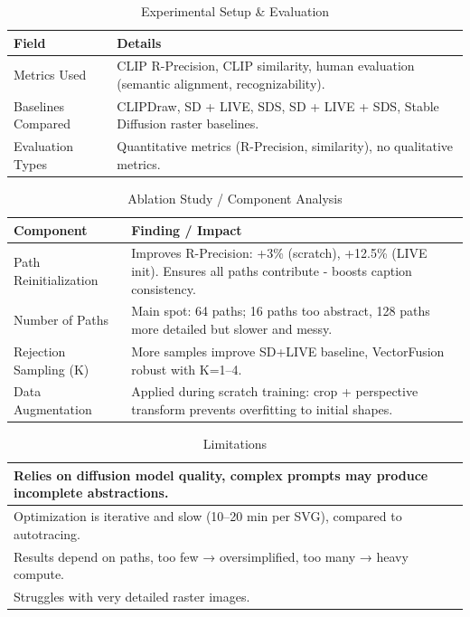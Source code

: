 \begin{table}[h!]
\centering
\caption{Experimental Setup \& Evaluation}
\begin{tabular}{|l|p{10cm}|}
\hline
\textbf{Field} & \textbf{Details} \\ \hline
Metrics Used & CLIP R-Precision, CLIP similarity, human evaluation (semantic alignment, recognizability). \\ \hline
Baselines Compared & CLIPDraw, SD + LIVE, SDS, SD + LIVE + SDS, Stable Diffusion raster baselines. \\ \hline
Evaluation Types & Quantitative metrics (R-Precision, similarity), no qualitative metrics. \\ \hline
\end{tabular}
\end{table}

\begin{table}[h!]
\centering
\caption{Ablation Study / Component Analysis}
\begin{tabular}{|l|p{10cm}|}
\hline
\textbf{Component} & \textbf{Finding / Impact} \\ \hline
Path Reinitialization & Improves R-Precision: +3\% (scratch), +12.5\% (LIVE init). Ensures all paths contribute - boosts caption consistency. \\ \hline
Number of Paths & Main spot: 64 paths; 16 paths too abstract, 128 paths more detailed but slower and messy. \\ \hline
Rejection Sampling (K) & More samples improve SD+LIVE baseline, VectorFusion robust with K=1–4. \\ \hline
Data Augmentation & Applied during scratch training: crop + perspective transform prevents overfitting to initial shapes. \\ \hline
\end{tabular}
\end{table}

\begin{table}[h!]
\centering
\caption{Limitations}
\begin{tabular}{|p{14cm}|}
\hline
Relies on diffusion model quality, complex prompts may produce incomplete abstractions. \\ \hline
Optimization is iterative and slow (10–20 min per SVG), compared to autotracing. \\ \hline
Results depend on paths, too few → oversimplified, too many → heavy compute. \\ \hline
Struggles with very detailed raster images. \\ \hline
\end{tabular}
\end{table}








